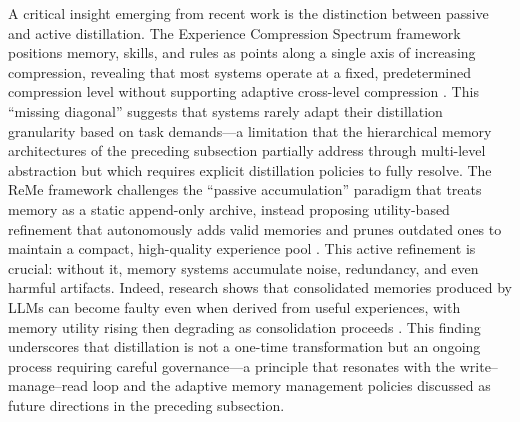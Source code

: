 \documentclass[11pt]{article}
\begin{document}
A critical insight emerging from recent work is the distinction between passive and active distillation. The Experience Compression Spectrum framework positions memory, skills, and rules as points along a single axis of increasing compression, revealing that most systems operate at a fixed, predetermined compression level without supporting adaptive cross-level compression \cite{ref133}. This ``missing diagonal'' suggests that systems rarely adapt their distillation granularity based on task demands---a limitation that the hierarchical memory architectures of the preceding subsection partially address through multi-level abstraction but which requires explicit distillation policies to fully resolve. The ReMe framework challenges the ``passive accumulation'' paradigm that treats memory as a static append-only archive, instead proposing utility-based refinement that autonomously adds valid memories and prunes outdated ones to maintain a compact, high-quality experience pool \cite{ref131}. This active refinement is crucial: without it, memory systems accumulate noise, redundancy, and even harmful artifacts. Indeed, research shows that consolidated memories produced by LLMs can become faulty even when derived from useful experiences, with memory utility rising then degrading as consolidation proceeds \cite{ref134}. This finding underscores that distillation is not a one-time transformation but an ongoing process requiring careful governance---a principle that resonates with the write--manage--read loop and the adaptive memory management policies discussed as future directions in the preceding subsection.
\end{document}
